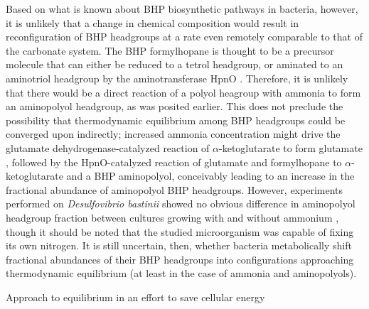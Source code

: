 Based on what is known about BHP biosynthetic pathways in bacteria, however, it is unlikely that a change in chemical composition would result in reconfiguration of BHP headgroups at a rate even remotely comparable to that of the carbonate system. The BHP formylhopane is thought to be a precursor molecule that can either be reduced to a tetrol headgroup, or aminated to an aminotriol headgroup by the aminotransferase HpnO \citep{welander2012identification}. Therefore, it is unlikely that there would be a direct reaction of a polyol heagroup with ammonia to form an aminopolyol headgroup, as was posited earlier. This does not preclude the possibility that thermodynamic equilibrium among BHP headgroups could be converged upon indirectly; increased ammonia concentration might drive the glutamate dehydrogenase-catalyzed reaction of $\alpha$-ketoglutarate to form glutamate \citep{}, followed by the HpnO-catalyzed reaction of glutamate and formylhopane to $\alpha$-ketoglutarate and a BHP aminopolyol, conceivably leading to an increase in the fractional abundance of aminopolyol BHP headgroups.  However, experiments performed on \textit{Desulfovibrio bastinii} showed no obvious difference in aminopolyol headgroup fraction between cultures growing with and without ammonium \citep{blumenberg2012novel}, though it should be noted that the studied microorganism was capable of fixing its own nitrogen. It is still uncertain, then, whether bacteria metabolically shift fractional abundances of their BHP headgroups into configurations approaching thermodynamic equilibrium (at least in the case of ammonia and aminopolyols).

Approach to equilibrium in an effort to save cellular energy





